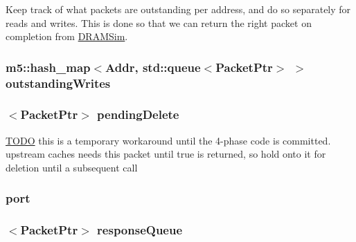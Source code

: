 \label{classDRAMSim2_aa436e51811d19fcd65fcc5061afc981a}
Keep track of what packets are outstanding per address, and do so separately for reads and writes. This is done so that we can return the right packet on completion from \hyperlink{namespaceDRAMSim}{DRAMSim}. \hypertarget{classDRAMSim2_ae3f05f6f5f0f558c32291a43c04fc1a1}{
\subsubsection[{outstandingWrites}]{\setlength{\rightskip}{0pt plus 5cm}m5::hash\_\-map$<${\bf Addr}, std::queue$<${\bf PacketPtr}$>$ $>$ {\bf outstandingWrites}}}
\label{classDRAMSim2_ae3f05f6f5f0f558c32291a43c04fc1a1}
\hypertarget{classDRAMSim2_a21da4bea3554874b557428e4cce5d4a4}{
\subsubsection[{pendingDelete}]{$<${\bf PacketPtr}$>$ {\bf pendingDelete}}}
\label{classDRAMSim2_a21da4bea3554874b557428e4cce5d4a4}
\begin{Desc}
\item[\hyperlink{todo__todo000084}{TODO}]this is a temporary workaround until the 4-\/phase code is committed. upstream caches needs this packet until true is returned, so hold onto it for deletion until a subsequent call \end{Desc}
\hypertarget{classDRAMSim2_a55c076720c982014096b57cadebf9a14}{
\subsubsection[{port}]{ {\bf port}}}
\label{classDRAMSim2_a55c076720c982014096b57cadebf9a14}
\hypertarget{classDRAMSim2_a7dd56c8ca058e3e734ec0460b1587932}{
\subsubsection[{responseQueue}]{$<${\bf PacketPtr}$>$ {\bf responseQueue}}}

